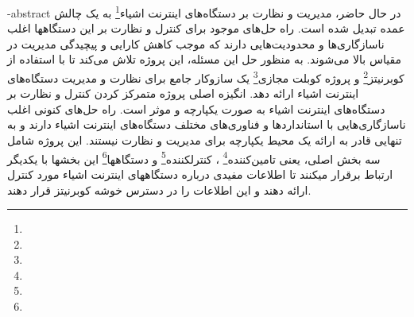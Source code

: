 \fa-abstract{
    در حال حاضر، مدیریت و نظارت بر دستگاه‌های
    اینترنت اشیاء\footnote{}
    به یک چالش عمده تبدیل شده است. راه حل‌های موجود
    برای کنترل و نظارت بر این دستگاهها اغلب ناسازگاری‌ها و محدودیت‌هایی دارند که موجب کاهش کارایی و پیچیدگی مدیریت در مقیاس بالا می‌شوند.
    به منظور حل این مسئله، این پروژه تلاش می‌کند تا با استفاده از 
    کوبرنیتز\footnote{}
    و پروژه
    کوبلت مجازی\footnote{}
    یک سازوکار جامع برای نظارت و مدیریت دستگاه‌های اینترنت اشیاء ارائه دهد. انگیزه اصلی پروژه متمرکز
    کردن کنترل و نظارت بر دستگاه‌های اینترنت اشیاء به صورت یکپارچه و موثر است. راه حل‌های کنونی اغلب ناسازگاری‌هایی
    با استانداردها و فناوری‌های مختلف دستگاه‌های اینترنت اشیاء دارند و به تنهایی قادر به ارائه یک محیط یکپارچه برای
    مدیریت و نظارت نیستند. این پروژه شامل سه بخش اصلی، یعنی
    تامین‌کننده\footnote{}
    ، کنترلکننده\footnote{}
    و دستگاهها\footnote{}
    این بخشها با یکدیگر ارتباط برقرار میکنند تا اطلاعات مفیدی درباره دستگاههای اینترنت اشیاء مورد کنترل ارائه دهند
    و این اطلاعات را در دسترس خوشه کوبرنیتز قرار دهند.
}
%

\abstractPage

\newpage\clearpage
